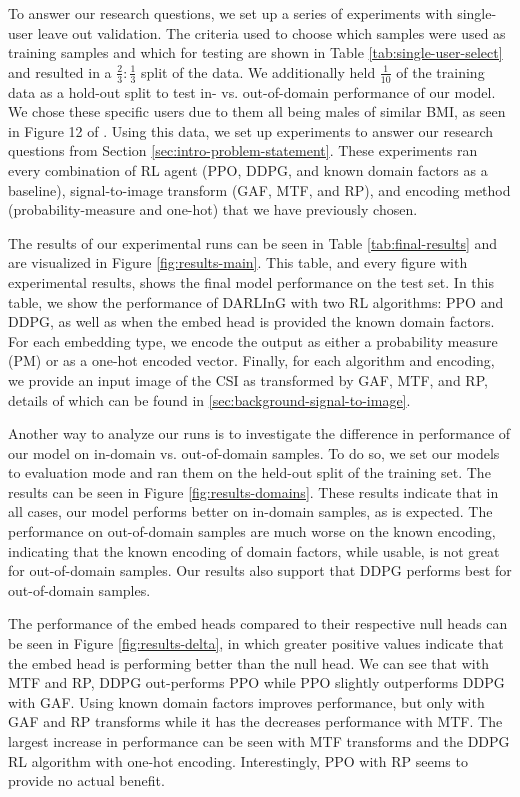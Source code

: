 To answer our research questions, we set up a series of experiments with single-user leave out validation.
The criteria used to choose which samples were used as training samples and which for testing are shown in Table \ref{tab:single-user-select} and resulted in a $\frac{2}{3}:\frac{1}{3}$ split of the data.
We additionally held $\frac{1}{10}$ of the training data as a hold-out split to test in- vs. out-of-domain performance of our model.
We chose these specific users due to them all being males of similar BMI, as seen in Figure 12 of \cite{zheng2019zero}.
Using this data, we set up experiments to answer our research questions from Section \ref{sec:intro-problem-statement}.
These experiments ran every combination of RL agent (PPO, DDPG, and known domain factors as a baseline), signal-to-image transform (GAF, MTF, and RP), and encoding method (probability-measure and one-hot) that we have previously chosen.

The results of our experimental runs can be seen in Table \ref{tab:final-results} and are visualized in Figure \ref{fig:results-main}.
This table, and every figure with experimental results, shows the final model performance on the test set.
In this table, we show the performance of DARLInG with two RL algorithms: PPO and DDPG, as well as when the embed head is provided the known domain factors.
For each embedding type, we encode the output as either a probability measure (PM) or as a one-hot encoded vector.
Finally, for each algorithm and encoding, we provide an input image of the CSI as transformed by GAF, MTF, and RP, details of which can be found in \ref{sec:background-signal-to-image}.

Another way to analyze our runs is to investigate the difference in performance of our model on in-domain vs. out-of-domain samples.
To do so, we set our models to evaluation mode and ran them on the held-out split of the training set.
The results can be seen in Figure \ref{fig:results-domains}.
These results indicate that in all cases, our model performs better on in-domain samples, as is expected.
The performance on out-of-domain samples are much worse on the known encoding, indicating that the known encoding of domain factors, while usable, is not great for out-of-domain samples.
Our results also support that DDPG performs best for out-of-domain samples.

The performance of the embed heads compared to their respective null heads can be seen in Figure \ref{fig:results-delta}, in which greater positive values indicate that the embed head is performing better than the null head.
We can see that with MTF and RP, DDPG out-performs PPO while PPO slightly outperforms DDPG with GAF.
Using known domain factors improves performance, but only with GAF and RP transforms while it has the decreases performance with MTF.
The largest increase in performance can be seen with MTF transforms and the DDPG RL algorithm with one-hot encoding.
Interestingly, PPO with RP seems to provide no actual benefit.

